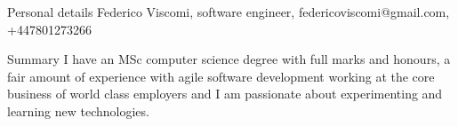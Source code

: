 \documentclass{resume}
\begin{document}
  \begin{rSection}{Personal details}
    Federico Viscomi, software engineer, federicoviscomi@gmail.com, +447801273266





  \end{rSection}

  
  \begin{rSection}{Summary}
   I have an MSc computer science degree with full marks and honours, 
    a fair amount of experience with agile software development working at the core business of world class employers
    and I am passionate about experimenting and learning new technologies.


  \end{rSection}
\end{document}
